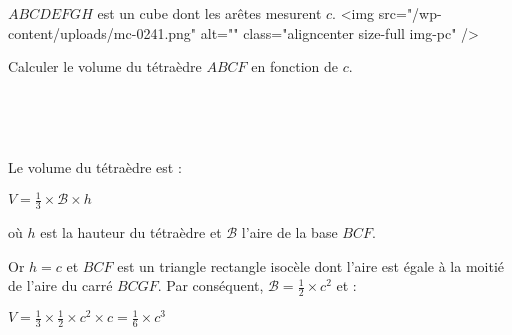 
%
$ABCDEFGH$ est un cube dont les arêtes mesurent $c$.
<img src="/wp-content/uploads/mc-0241.png" alt="" class="aligncenter size-full  img-pc" />

\begin{center}
\end{center}
Calculer le volume du tétraèdre $ABCF$ en fonction de $c$.
\par
~
\begin{corrige}
     ~
     \par
     Le volume du tétraèdre est :
     \par
     $V=\frac{1}{3}\times \mathscr B\times h$
     \par
     où $h$ est la hauteur du tétraèdre et $\mathscr B$ l'aire de la base $BCF$.
     \par
     Or $h=c$ et $BCF$ est un triangle rectangle isocèle dont l'aire est égale à la moitié de l'aire du carré $BCGF$. Par conséquent, $\mathscr B=\frac{1}{2}\times c^{2}$ et :
     \par
     $V=\frac{1}{3}\times \frac{1}{2}\times c^{2}\times c=\frac{1}{6}\times c^{3}$
\end{corrige}
